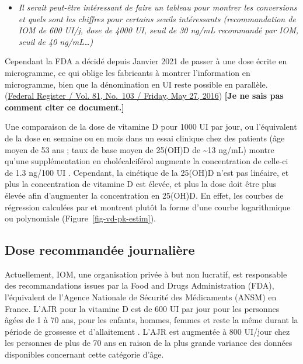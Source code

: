 \documentclass[
  a4paper,
  DIV=11,
  numbers=noendperiod,
  listof=totoc]{scrreprt}
\providecommand{\tightlist}{%
  \setlength{\itemsep}{0pt}\setlength{\parskip}{0pt}}\usepackage{longtable,booktabs,array}
\begin{document}
\begin{itemize}
\tightlist
\item
  \emph{Il serait peut-être intéressant de faire un tableau pour montrer
  les conversions et quels sont les chiffres pour certains seuils
  intéressants (recommandation de IOM de 600 UI/j, dose de 4000 UI,
  seuil de 30 ng/mL recommandé par IOM, seuil de 40 ng/mL\ldots)}
\end{itemize}

Cependant la \ac{FDA} a décidé depuis Janvier 2021 de passer à une dose
écrite en microgramme, ce qui oblige les fabricants à montrer
l'information en microgramme, bien que la dénomination en UI reste
possible en parallèle.
(\href{https://www.govinfo.gov/content/pkg/FR-2016-05-27/pdf/2016-11867.pdf}{Federal
Register / Vol. 81, No.~103 / Friday, May 27, 2016}) \textbf{{[}Je ne
sais pas comment citer ce document.{]}}

Une comparaison de la dose de vitamine D pour 1000 UI par jour, ou
l'équivalent de la dose en semaine ou en mois dans un essai clinique
chez des patients (âge moyen de 53 ans ; taux de base moyen de 25(OH)D
de \textasciitilde13 ng/mL) montre qu'une supplémentation en
cholécalciférol augmente la concentration de celle-ci de 1.3 ng/100 UI
\autocite{Bouillon.2017}. Cependant, la cinétique de la 25(OH)D n'est
pas linéaire, et plus la concentration de vitamine D est élevée, et plus
la dose doit être plus élevée afin d'augmenter la concentration en
25(OH)D. En effet, les courbes de régression calculées par
\textcite{Veugelers.2014} et \textcite{Heaney.2015} montrent plutôt la
forme d'une courbe logarithmique ou polynomiale
(Figure~\ref{fig-vd-pk-estim}).

\hypertarget{dose-recommanduxe9e-journaliuxe8re}{%
\subsection{Dose recommandée
journalière}\label{dose-recommanduxe9e-journaliuxe8re}}

Actuellement, \ac{IOM}, une organisation privée à but non lucratif, est
responsable des recommandations issues par la Food and Drugs
Administration (FDA), l'équivalent de l'Agence Nationale de Sécurité des
Médicaments (ANSM) en France. L'\ac{AJR} pour la vitamine D est de 600
UI par jour pour les personnes âgées de 1 à 70 ans, pour les enfants,
hommes, femmes et reste la même durant la période de grossesse et
d'allaitement \autocite{IOM.2011.org}. L'AJR est augmentée à 800 UI/jour
chez les personnes de plus de 70 ans en raison de la plus grande
variance des données disponibles concernant cette catégorie d'âge.
\end{document}

